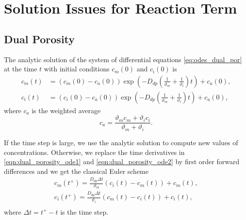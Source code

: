\section{Solution Issues for Reaction Term}

% 

\subsection{Dual Porosity} 
\label{sec:num_dual_porosity}

The analytic solution of the system of differential equations \eqref{eq:odes_dual_por} at the time $t$ with initial conditions $c_m(0)$ and $c_i(0)$ is
\begin{align}
     c_m(t) &= (c_m(0) - c_a(0)) \exp\left(- D_{dp}\left(\frac{1}{\vartheta_m} + \frac{1}{\vartheta_i}\right) t \right) + c_a(0), 
     \label{eqn:dual_porosity_anal1}\\
     c_i(t) &= (c_i(0) - c_a(0)) \exp\left(- D_{dp}\left(\frac{1}{\vartheta_m} + \frac{1}{\vartheta_i}\right) t \right) + c_a(0),
     \label{eqn:dual_porosity_anal2}
\end{align}
where $c_a$ is the weighted average
\[
  c_a = \frac{\vartheta_m c_m + \vartheta_i c_i}{\vartheta_m + \vartheta_i}.
\]

If the time step is large, we use the analytic solution to compute new values of concentrations. 
Otherwise, we replace the time derivatives in \eqref{eqn:dual_porosity_ode1} and \eqref{eqn:dual_porosity_ode2} 
by first order forward differences and we get the classical Euler scheme
\begin{subequations}
\label{eq:dp_expl_euler}
\begin{align}
  c_m(t^+) = \frac{D_{dp} \Delta t}{\vartheta_m}(c_i(t) - c_m(t)) + c_m(t), \\
  c_i(t^+) = \frac{D_{dp} \Delta t}{\vartheta_i}(c_m(t) - c_i(t)) + c_i(t), \\
\end{align}
\end{subequations}
where $\Delta t = t^+ - t$ is the time step. 

